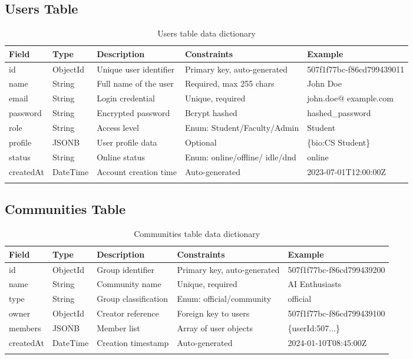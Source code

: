 \subsection{Users Table}
\begin{longtable}{|L{3cm}|C{2cm}|L{2.5cm}|L{3cm}|L{3cm}|}
\hline
\textbf{Field} & \textbf{Type} & \textbf{Description} & \textbf{Constraints} & \textbf{Example} \\ \hline
\endhead

id & ObjectId & Unique user identifier & Primary key, auto-generated & 507f1f77bc-f86cd799439011 \\ \hline
name & String & Full name of the user & Required, max 255 chars & John Doe \\ \hline
email & String & Login credential & Unique, required & john.doe@ example.com \\ \hline
password & String & Encrypted password & Bcrypt hashed & hashed\_password \\ \hline
role & String & Access level & Enum: Student/Faculty/Admin & Student \\ \hline
profile & JSONB & User profile data & Optional & \{bio:CS Student\} \\ \hline
status & String & Online status & Enum: online/offline/ idle/dnd & online \\ \hline
createdAt & DateTime & Account creation time & Auto-generated & 2023-07-01T12:00:00Z \\ \hline

\caption{Users table data dictionary}
\label{tab:users_dict}
\end{longtable}

\subsection{Communities Table}
\begin{longtable}{|L{3cm}|C{2cm}|L{2.5cm}|L{3cm}|L{3cm}|}
\hline
\textbf{Field} & \textbf{Type} & \textbf{Description} & \textbf{Constraints} & \textbf{Example} \\ \hline
\endhead

id & ObjectId & Group identifier & Primary key, auto-generated & 507f1f77bc-f86cd799439200 \\ \hline
name & String & Community name & Unique, required & AI Enthusiasts \\ \hline
type & String & Group classification & Enum: official/community & official \\ \hline
owner & ObjectId & Creator reference & Foreign key to users & 507f1f77bc-f86cd799439100 \\ \hline
members & JSONB & Member list & Array of user objects & \{userId:507...\} \\ \hline
createdAt & DateTime & Creation timestamp & Auto-generated & 2024-01-10T08:45:00Z \\ \hline

\caption{Communities table data dictionary}
\label{tab:communities_dict}
\end{longtable}


